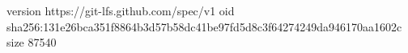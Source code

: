 version https://git-lfs.github.com/spec/v1
oid sha256:131e26bca351f8864b3d57b58dc41be97fd5d8c3f64274249da946170aa1602c
size 87540
